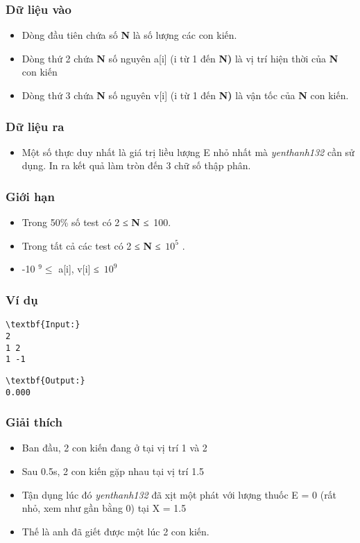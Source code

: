 \subsubsection{\textbf{Dữ liệu vào }}
\begin{itemize}
	\item Dòng đầu tiên chứa số \textbf{ N } là số lượng các con kiến.
	\item Dòng thứ 2 chứa \textbf{ N } số nguyên a[i] (i từ 1 đến \textbf{ N) } là vị trí hiện thời của \textbf{ N } con kiến
	\item Dòng thứ 3 chứa \textbf{ N } số nguyên v[i] (i từ 1 đến \textbf{ N) } là vận tốc của \textbf{ N } con kiến.
\end{itemize}

\subsubsection{\textbf{Dữ liệu ra }}
\begin{itemize}
	\item Một số thực duy nhất là giá trị liều lượng E nhỏ nhất mà \emph{ yenthanh132 } cần sử dụng. In ra kết quả làm tròn đến 3 chữ số thập phân.
\end{itemize}

\subsubsection{Giới hạn}
\begin{itemize}
	\item Trong 50\% số test có 2 ≤ \textbf{ N } ≤ 100.
	\item Trong tất cả các test có 2 ≤ \textbf{ N } ≤ $10^{5}$ .
	\item -10 $^ 9 ≤ $ a[i], v[i] ≤ $10^{9}$
\end{itemize}
\begin{itemize}
\end{itemize}

\subsubsection{\textbf{Ví dụ }}
\begin{verbatim}
\textbf{Input:}
2
1 2
1 -1
\end{verbatim}
\begin{verbatim}
\textbf{Output:}
0.000\end{verbatim}

\subsubsection{Giải thích}
\begin{itemize}
	\item Ban đầu, 2 con kiến đang ở tại vị trí 1 và 2
	\item Sau 0.5s, 2 con kiến gặp nhau tại vị trí 1.5
	\item Tận dụng lúc đó \emph{ yenthanh132 } đã xịt một phát với lượng thuốc E = 0 (rất nhỏ, xem như gần bằng 0) tại X = 1.5
	\item Thế là anh đã giết được một lúc 2 con kiến.
\end{itemize}
